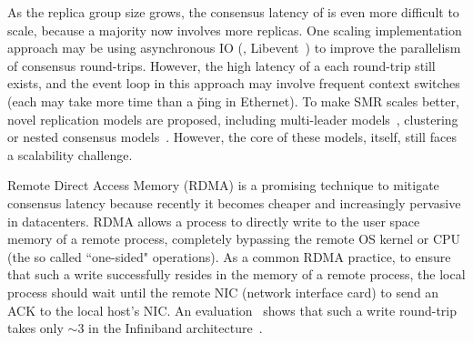 As the replica group size grows, the consensus latency of \paxos is even more 
difficult to scale, because a majority now involves more replicas. One 
scaling implementation approach may be using asynchronous IO (\eg, 
Libevent~\cite{libevent}) to improve the parallelism of consensus round-trips. 
However, the high latency of a each round-trip still exists, and the event loop 
in this approach may involve frequent context switches (each may take more time 
than a \v{ping} in Ethernet). To make SMR scales better, novel replication 
models are proposed, including multi-leader 
models~\cite{epaxos:sosp13,mencius:osdi08}, clustering or nested consensus 
models~\cite{scatter:sosp11,manos:hotdep10}. However, the core of these models, 
\paxos itself, still faces a scalability challenge.




Remote Direct Access Memory (RDMA) is a promising technique to mitigate 
consensus latency because recently it becomes cheaper and increasingly 
pervasive in datacenters. RDMA allows a process to directly write to the 
user space memory of a remote process, completely bypassing the remote OS 
kernel or CPU (the so called ``one-sided" operations). As a common 
RDMA practice, to ensure that such a write successfully resides in the 
memory of a remote process, the local process should wait until the remote NIC 
(network interface card) to send an ACK to the local host's NIC. An 
evaluation~\cite{pilaf:usenix14} shows that such a write round-trip takes only 
$\sim$3 \us in the Infiniband architecture~\cite{infiniband}.

